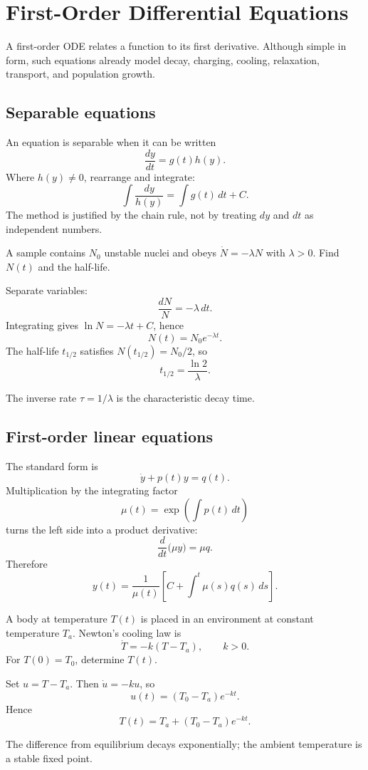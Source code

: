 \section{First-Order Differential Equations}
\label{sec:ch4-first-order}

A first-order ODE relates a function to its first derivative. Although simple in form, such equations already model decay, charging, cooling, relaxation, transport, and population growth.

\subsection{Separable equations}
An equation is separable when it can be written
\[
\frac{dy}{dt}=g(t)h(y).
\]
Where $h(y)\neq0$, rearrange and integrate:
\[
\int \frac{dy}{h(y)}=\int g(t)\,dt+C.
\]
The method is justified by the chain rule, not by treating $dy$ and $dt$ as independent numbers.

\begin{workedexample}
A sample contains $N_0$ unstable nuclei and obeys $\dot N=-\lambda N$ with $\lambda>0$. Find $N(t)$ and the half-life.
\begin{solution}
Separate variables:
\[
\frac{dN}{N}=-\lambda\,dt.
\]
Integrating gives $\ln N=-\lambda t+C$, hence
\[
N(t)=N_0e^{-\lambda t}.
\]
The half-life $t_{1/2}$ satisfies $N(t_{1/2})=N_0/2$, so
\[
\boxed{t_{1/2}=\frac{\ln2}{\lambda}}.
\]
\end{solution}
The inverse rate $\tau=1/\lambda$ is the characteristic decay time.
\end{workedexample}

\subsection{First-order linear equations}
The standard form is
\[
\dot y+p(t)y=q(t).
\]
Multiplication by the integrating factor
\[
\mu(t)=\exp\left(\int p(t)\,dt\right)
\]
turns the left side into a product derivative:
\[
\frac{d}{dt}\bigl(\mu y\bigr)=\mu q.
\]
Therefore
\[
\boxed{y(t)=\frac{1}{\mu(t)}\left[C+\int^t\mu(s)q(s)\,ds\right]}.
\]

\begin{workedexample}
A body at temperature $T(t)$ is placed in an environment at constant temperature $T_a$. Newton's cooling law is
\[
\dot T=-k(T-T_a),\qquad k>0.
\]
For $T(0)=T_0$, determine $T(t)$.
\begin{solution}
Set $u=T-T_a$. Then $\dot u=-ku$, so
\[
u(t)=(T_0-T_a)e^{-kt}.
\]
Hence
\[
\boxed{T(t)=T_a+(T_0-T_a)e^{-kt}}.
\]
\end{solution}
The difference from equilibrium decays exponentially; the ambient temperature is a stable fixed point.
\end{workedexample}

